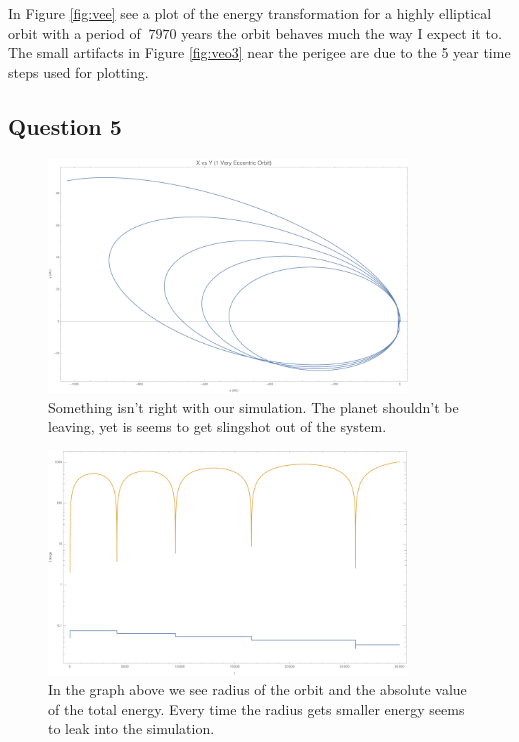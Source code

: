 \documentclass{article}
\begin{document}
In Figure \ref{fig:vee} see a plot of the energy transformation for a highly elliptical orbit with a period of $ ~7970 $ years the orbit behaves much the way I expect it to. The small artifacts in Figure \ref{fig:veo3} near the perigee are due to the 5 year time steps used for plotting.


\subsection{Question 5}

\begin{figure}[!htb]
	\begin{center}
		\includegraphics[width=0.85\textwidth]{veo.pdf}
	\end{center}
	\caption{Something isn't right with our simulation. The planet shouldn't be leaving, yet is seems to get slingshot out of the system.}
	\label{fig:veo}
\end{figure}
\FloatBarrier


\begin{figure}[!htb]
	\begin{center}
		\includegraphics[width=0.85\textwidth]{ver.pdf}
	\end{center}
	\caption{In the graph above we see radius of the orbit and the absolute value of the total energy. Every time the radius gets smaller energy seems to leak into the simulation.}
	\label{fig:ver}
\end{figure}
\FloatBarrier
\end{document}
